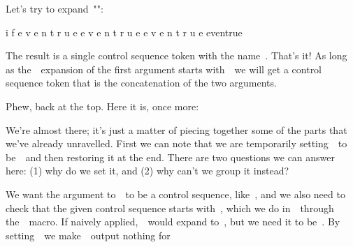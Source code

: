 {{Let's try to expand~\type"":

\starttyping
{}
\csname \expandafter\if@{}\endcsname
\csname \if@ i f e v e n {t r u e}\endcsname
\csname e v e n {t r u e}\endcsname
\csname e v e n t r u e\endcsname   %
eventrue
\stoptyping

The result is a single control sequence token with the
name~. That's it! As long as the~\type{\string}~expansion
of the first argument starts with~~we will get a control
sequence token that is the concatenation of the two arguments.

\stopsectionlevel

\startsectionlevel[title={The
First~\type{\def}},reference={the-first-def}]

Phew, back at the top. Here it is, once more:

\starttyping
\outer\def\newif#1{
    \count@=\escapechar
    \escapechar=-1
    \expandafter\expandafter\expandafter \def\@if#1{true}{\let#1=\iftrue}%
    \expandafter\expandafter\expandafter \def\@if#1{false}{\let#1=\iffalse}%
    \@if#1{false} %
    \escapechar=\count@
}
\stoptyping

We're almost there; it's just a matter of piecing together some of the
parts that we've already unravelled. First we can note that we are
temporarily setting~\type{\escapechar}~to be~~and then
restoring it at the end. There are two questions we can answer here: (1)
why do we set it, and (2) why can't we group it instead?

\startlists
\item
  We want the argument to~\type{\newif}~to be a control sequence,
  like~\type{\newif\ifred}, and we also need to check that the given
  control sequence starts with~, which we do
  in~\type{\if@}~through the~\type{\string}~macro. If naively
  applied,~\type{\string\ifred}~would expand to~, but
  we need it to be~. By setting~~we
  make~\type{\string}~output nothing for~}}
